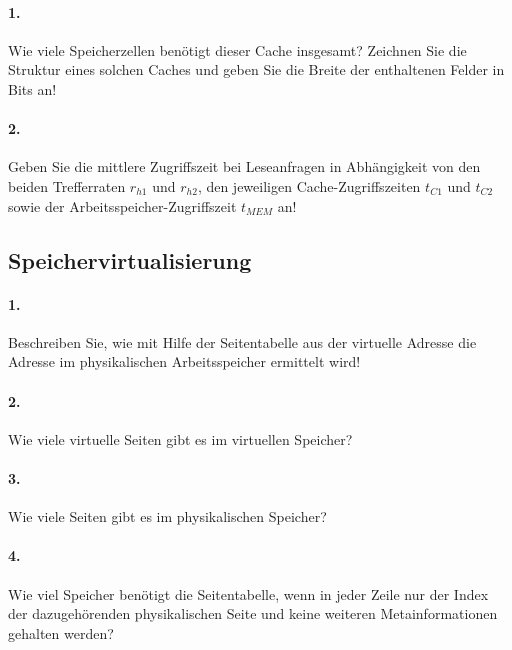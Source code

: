 \documentclass[paper=a4, fontsize=11pt]{scrartcl}
\numberwithin{equation}{section}
\numberwithin{figure}{section}
\numberwithin{table}{section}
\begin{document}
\paragraph{1.}
Wie viele Speicherzellen benötigt dieser Cache insgesamt? Zeichnen Sie die Struktur eines solchen Caches und geben Sie die Breite der enthaltenen Felder in Bits an!

\paragraph{2.}
Geben Sie die mittlere Zugriffszeit bei Leseanfragen in Abhängigkeit von den beiden Trefferraten $r_{h1}$ und $r_{h2}$, den jeweiligen Cache-Zugriffszeiten $t_{C1}$ und $t_{C2}$ sowie der Arbeitsspeicher-Zugriffszeit $t_{MEM}$ an!

\subsection{Speichervirtualisierung}

\paragraph{1.}
Beschreiben Sie, wie mit Hilfe der Seitentabelle aus der virtuelle Adresse die Adresse im physikalischen Arbeitsspeicher ermittelt wird!

\paragraph{2.}
Wie viele virtuelle Seiten gibt es im virtuellen Speicher?

\paragraph{3.}
Wie viele Seiten gibt es im physikalischen Speicher?

\paragraph{4.}
Wie viel Speicher benötigt die Seitentabelle, wenn in jeder Zeile nur der Index der dazugehörenden physikalischen Seite und keine weiteren Metainformationen gehalten werden?

\end{document}

